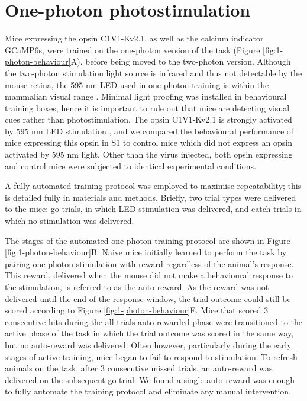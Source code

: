 \section{One-photon photostimulation}

Mice expressing the opsin C1V1-Kv2.1, as well as the calcium indicator GCaMP6s, were trained on the one-photon version of the task (Figure \ref{fig:1-photon-behaviour}A), before being moved to the two-photon version. Although the two-photon stimulation light source is infrared and thus not detectable by the mouse retina, the 595 nm LED used in one-photon training is within the mammalian visual range \cite{peirson_light_2018}. Minimal light proofing was installed in behavioural training boxes; hence it is important to rule out that mice are detecting visual cues rather than photostimulation. The opsin C1V1-Kv2.1 is strongly activated by 595 nm LED stimulation \cite{yizhar_neocortical_2011, chettih_single-neuron_2019}, and we compared the behavioural performance of mice expressing this opsin in S1 to control mice which did not express an opsin activated by 595 nm light. Other than the virus injected, both opsin expressing and control mice were subjected to identical experimental conditions. 

A fully-automated training protocol was employed to maximise repeatability; this is detailed fully in materials and methods. Briefly, two trial types were delivered to the mice: go trials, in which LED stimulation was delivered, and catch trials in which no stimulation was delivered. 

The stages of the automated one-photon training protocol are shown in Figure \ref{fig:1-photon-behaviour}B. Naive mice initially learned to perform the task by pairing one-photon stimulation with reward regardless of the animal's response. This reward, delivered when the mouse did not make a behavioural response to the stimulation, is referred to as the auto-reward. As the reward was not delivered until the end of the response window, the trial outcome could still be scored according to Figure \ref{fig:1-photon-behaviour}E. Mice that scored 3 consecutive hits during the all trials auto-rewarded phase were transitioned to the active phase of the task in which the trial outcome was scored in the same way, but no auto-reward was delivered. Often however, particularly during the early stages of active training, mice began to fail to respond to stimulation. To refresh animals on the task, after 3 consecutive missed trials, an auto-reward was delivered on the subsequent go trial. We found a single auto-reward was enough to fully automate the training protocol and eliminate any manual intervention. 

